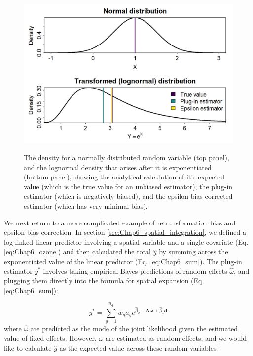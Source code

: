 \begin{figure}[!ht]
    \caption[Retransformation bias and the epsilon bias-correction estimator]{The density for a normally distributed random variable (top panel), and the lognormal density that arises after it is exponentiated (bottom panel), showing the analytical calculation of it's expected value (which is the true value for an unbiased estimator), the plug-in estimator (which is negatively biased), and the epsilon bias-corrected estimator (which has very minimal bias).}
    \centering
    \includegraphics[width=5.5in]{Chap_6/Retransformation_bias.png}
    \label{fig:Chap6_retransformation_bias}
\end{figure}

We next return to a more complicated example of retransformation bias and epsilon bias-correction.  In section \ref{sec:Chap6_spatial_integration}, we defined a log-linked linear predictor involving a spatial variable and a single covariate (Eq. \ref{eq:Chap6_ozone}) and then calculated the total \( \hat y \) by summing across the exponentiated value of the linear predictor (Eq. \ref{eq:Chap6_sum}).  The plug-in estimator \(y^*\) involves taking empirical Bayes predictions of random effects \(\hat\omega\), and plugging them directly into the formula for spatial expansion (Eq. \ref{eq:Chap6_sum}):

\begin{equation}
   y^* = \sum_{g=1}^{n_g} w_g a_g e^{\hat\beta_0 + \mathbf{A \hat\omega} + \hat\beta_1 \mathbf{d}}  
\end{equation}
where \( \hat\omega \) are predicted as the mode of the joint likelihood given the estimated value of fixed effects.  However, \( \omega\) are estimated as random effects, and we would like to calculate \(\hat y\) as the expected value across these random variables:

